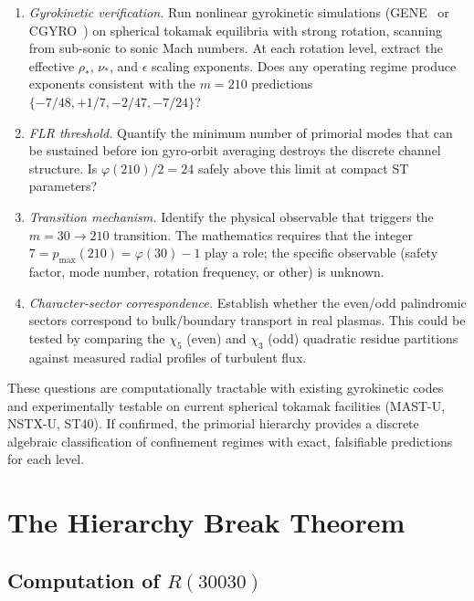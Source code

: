 \documentclass[11pt,letterpaper]{article}
\theoremstyle{definition}
\begin{document}
\begin{enumerate}[nosep]
\item \emph{Gyrokinetic verification.} Run nonlinear gyrokinetic simulations (GENE~\cite{jenko2000} or CGYRO~\cite{candy2016}) on spherical tokamak equilibria with strong rotation, scanning from sub-sonic to sonic Mach numbers. At each rotation level, extract the effective $\rho_*$, $\nu_*$, and $\epsilon$ scaling exponents. Does any operating regime produce exponents consistent with the $m = 210$ predictions $\{-7/48, +1/7, -2/47, -7/24\}$?

\item \emph{FLR threshold.} Quantify the minimum number of primorial modes that can be sustained before ion gyro-orbit averaging destroys the discrete channel structure. Is $\varphi(210)/2 = 24$ safely above this limit at compact ST parameters?

\item \emph{Transition mechanism.} Identify the physical observable that triggers the $m = 30 \to 210$ transition. The mathematics requires that the integer $7 = p_{\text{max}}(210) = \varphi(30) - 1$ play a role; the specific observable (safety factor, mode number, rotation frequency, or other) is unknown.

\item \emph{Character-sector correspondence.} Establish whether the even/odd palindromic sectors correspond to bulk/boundary transport in real plasmas. This could be tested by comparing the $\chi_5$ (even) and $\chi_3$ (odd) quadratic residue partitions against measured radial profiles of turbulent flux.
\end{enumerate}

These questions are computationally tractable with existing gyrokinetic codes and experimentally testable on current spherical tokamak facilities (MAST-U, NSTX-U, ST40). If confirmed, the primorial hierarchy provides a discrete algebraic classification of confinement regimes with exact, falsifiable predictions for each level.


\section{The Hierarchy Break Theorem}

\subsection{Computation of $R(30030)$}
\end{document}
